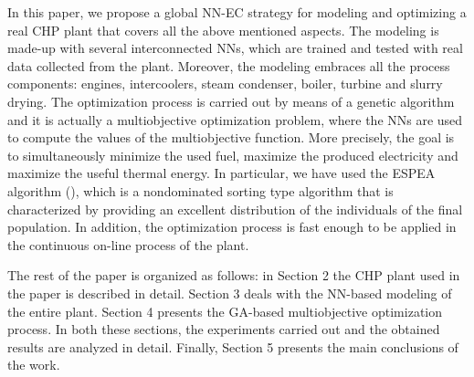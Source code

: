 In this paper, we propose a global NN-EC strategy for modeling and optimizing a real CHP plant that covers all the above mentioned aspects. The modeling is made-up with several interconnected NNs, which are trained and tested with real data collected from the plant. Moreover, the modeling embraces all the process components: engines, intercoolers, steam condenser, boiler, turbine and slurry drying. The optimization process is carried out by means of a genetic algorithm and it is actually a multiobjective optimization problem, where the NNs are used to compute the values of the multiobjective function. More precisely, the goal is to simultaneously minimize the used fuel, maximize the produced electricity and maximize the useful thermal energy. In particular, we have used the ESPEA algorithm (\cite{espea}), which is a nondominated sorting type algorithm that is characterized by providing an excellent distribution of the individuals of the final population. In addition, the optimization process is fast enough to be applied in the continuous on-line process of the plant.  

The rest of the paper is organized as follows: in Section 2 the CHP plant used in the paper is described in detail. Section 3 deals with the NN-based modeling of the entire plant. Section 4 presents the GA-based multiobjective optimization process. In both these sections, the experiments carried out and the obtained results are analyzed in detail. Finally, Section 5 presents the main conclusions of the work.
\FloatBarrier